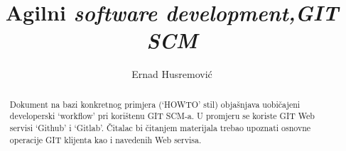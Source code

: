\documentclass[times, utf8, seminar]{fit}
\begin{document}






\title{Agilni \em{software development},\newline GIT SCM}

\author{Ernad Husremović}


\maketitle

\tableofcontents

\newpage

\begin{abstract}

Dokument na bazi konkretnog primjera (`HOWTO' stil) objašnjava uobičajeni developerski `workflow' pri korištenu GIT SCM-a. U promjeru se koriste GIT Web servisi `Github' i `Gitlab'.
Čitalac bi čitanjem materijala trebao upoznati osnovne operacije GIT klijenta kao i navedenih Web servisa.


\end{abstract}
\end{document}
